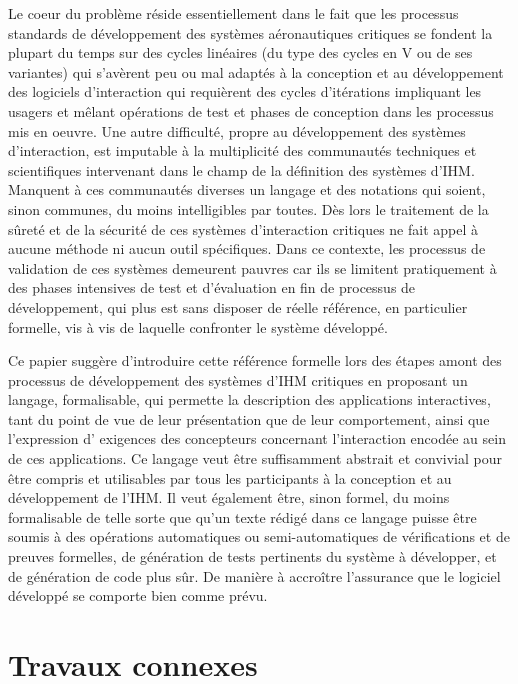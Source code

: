 \documentclass{ihm}
\begin{document}
Le  coeur du  problème réside  essentiellement  dans le  fait que  les
processus  standards  de   développement  des  systèmes  aéronautiques
critiques se fondent la plupart du  temps sur des cycles linéaires (du
type des  cycles en V  ou de ses variantes)  qui s'avèrent peu  ou mal
adaptés   à  la   conception   et  au   développement  des   logiciels
d'interaction qui  requièrent des  cycles d'itérations  impliquant les
usagers et mêlant opérations de test  et phases de conception dans les
processus mis en oeuvre. Une autre difficulté, propre au développement
des  systèmes  d'interaction,  est  imputable à  la  multiplicité  des
communautés techniques  et scientifiques intervenant dans  le champ de
la définition des systèmes d'IHM.  Manquent à ces communautés diverses
un  langage et  des notations  qui  soient, sinon  communes, du  moins
intelligibles par toutes. Dès lors le traitement de la sûreté et de la
sécurité  de ces  systèmes  d'interaction critiques  ne  fait appel  à
aucune  méthode ni  aucun outil  spécifiques.  Dans  ce contexte,  les
processus de validation  de ces systèmes demeurent pauvres  car ils se
limitent pratiquement à des phases  intensives de test et d'évaluation
en fin  de processus de développement,  qui plus est sans  disposer de
réelle  référence, en  particulier  formelle, vis  à  vis de  laquelle
confronter le système développé.

Ce  papier  suggère d'introduire  cette  référence  formelle lors  des
étapes  amont  des  processus  de  développement  des  systèmes  d'IHM
critiques  en  proposant un  langage,  formalisable,  qui permette  la
description des  applications interactives,  tant du  point de  vue de
leur présentation que de leur  comportement, ainsi que l'expression d'
exigences des concepteurs concernant  l'interaction encodée au sein de
ces  applications.   Ce langage  veut  être  suffisamment abstrait  et
convivial pour être compris et utilisables par tous les participants à
la conception  et au développement  de l'IHM. Il veut  également être,
sinon formel,  du moins  formalisable de telle  sorte que  qu'un texte
rédigé  dans   ce  langage  puisse   être  soumis  à   des  opérations
automatiques  ou  semi-automatiques  de vérifications  et  de  preuves
formelles, de génération de tests  pertinents du système à développer,
et de génération de code plus  sûr. De manière à accroître l'assurance
que le logiciel développé se comporte bien comme prévu.

\section{Travaux connexes}
\label{sec:travaux}
\end{document}
